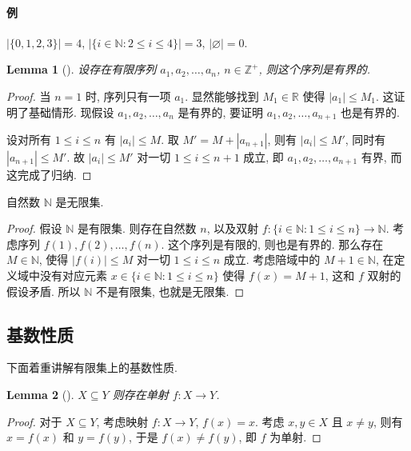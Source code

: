 \documentclass[UTF8]{ctexart}
\theoremstyle{mystyle}
\newtheorem{lemma}{Lemma}[section]
\theoremstyle{myremark}
\theoremstyle{plain}
\newcommand{\R}{\mathbb R}
\newcommand{\Z}{\mathbb Z}
\newcommand{\N}{\mathbb N}
\newcommand{\set}[1]{\{#1\}}
\begin{document}
\paragraph{例}
$ |\set{0, 1, 2, 3}| = 4 $, $ |\set{i \in \N \colon 2 \leqslant i \leqslant 4}| = 3 $, $ |\varnothing| = 0 $.

\begin{lemma}[]
    设存在有限序列 $ a_1, a_2, \dots, a_n $, $ n \in \Z^+ $, 则这个序列是有界的.
\end{lemma}

\begin{proof}
    当 $ n = 1 $ 时, 序列只有一项 $ a_1 $. 显然能够找到 $ M_1 \in \R $ 使得 $ |a_1| \leqslant M_1 $. 这证明了基础情形. 现假设 $ a_1, a_2, \dots, a_n $ 是有界的, 要证明 $ a_1, a_2, \dots, a_{n + 1} $ 也是有界的.

    设对所有 $ 1 \leqslant i \leqslant n $ 有 $ |a_i| \leqslant M $. 取 $ M' = M + |a_{n + 1}| $, 则有 $ |a_i| \leqslant M' $, 同时有 $ |a_{n + 1}| \leqslant M' $. 故 $ |a_i| \leqslant M' $ 对一切 $ 1 \leqslant i \leqslant n+1 $ 成立, 即 $ a_1, a_2, \dots, a_{n + 1} $ 有界, 而这完成了归纳.
\end{proof}


\begin{theorem}
    自然数 $ \N $ 是无限集.
\end{theorem}

\begin{proof}
    假设 $ \N $ 是有限集. 则存在自然数 $ n $, 以及双射 $ f \colon \set{i \in \N \colon 1 \leqslant i \leqslant n} \to \N $. 考虑序列 $ f(1), f(2), \dots, f(n) $. 这个序列是有限的, 则也是有界的. 那么存在 $ M \in \N $, 使得 $ |f(i)| \leqslant M $ 对一切 $ 1 \leqslant i \leqslant n $ 成立. 考虑陪域中的 $ M + 1 \in \N $, 在定义域中没有对应元素 $ x \in \set{i \in \N \colon 1 \leqslant i \leqslant n} $ 使得 $ f(x) = M + 1 $, 这和 $ f $ 双射的假设矛盾. 所以 $ \N $ 不是有限集, 也就是无限集.
\end{proof}

\subsection{基数性质}
下面着重讲解有限集上的基数性质.

\begin{lemma}[] \label{subset-injection}
    $ X \subseteq Y $ 则存在单射 $ f \colon X \to Y $.
\end{lemma}

\begin{proof}
    对于 $ X \subseteq Y $, 考虑映射 $ f\colon X \to Y $, $ f(x) = x $. 考虑 $ x, y \in X $ 且 $ x \neq y $, 则有 $ x = f(x) $ 和 $ y = f(y) $, 于是 $ f(x) \neq f(y) $, 即 $ f $ 为单射.
\end{proof}
\end{document}
